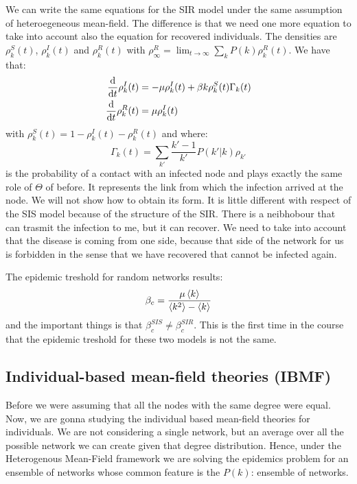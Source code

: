 \documentclass[../main/main.tex]{subfiles}
\begin{document}
We can write the same equations for the SIR model under the same assumption of heteroegeneous mean-field.
The difference is that we need one more equation to take into account also the equation for recovered individuals. The densities are \( \rho _k^S(t) \), \( \rho _k^I (t) \) and \( \rho _k^R (t) \) with \( \rho _ \infty ^R = \lim_{t \rightarrow \infty } \sum_{k}^{} P(k) \rho _k^R (t) \). We have that:
\begin{equation}
\begin{split}
  \dv{}{t} \rho _k^I (t) &= - \mu \rho _k^I (t) + \beta k \rho _k^S (t) \Gamma _k(t)  \\
  \dv{}{t} \rho _k^R (t) &= \mu \rho _k^I (t)
\end{split}
\end{equation}
with \( \rho _k^S (t) = 1 - \rho _k^I (t) - \rho _k^R (t)\) and where:
\begin{equation}
  \Gamma _k (t) = \sum_{k'}^{} \frac{k'-1}{k'} P(k'|k) \rho _{k'}
\end{equation}
is the probability of a contact with an infected node and plays exactly the same role of \( \Theta  \) of before.
It represents the link from which the infection arrived at the node. We will not show how to obtain its form.  It is little different with respect of the SIS model because of the structure of the SIR.
There is a neibhobour that can trasmit the infection to me, but it can recover. We need to take into account that the disease is coming from one side, because that side of the network for us is forbidden in the sense that we have recovered that cannot be infected again.

The epidemic treshold for random networks results:
\begin{equation}
  \beta _c = \frac{\mu \expval{k} }{\expval{k^2} - \expval{k} }
\end{equation}
and the important things is that \( \beta _c^{SIS} \neq \beta _c^{SIR} \). This is the first time in the course that the epidemic treshold for these two models is not the same.

\subsection{Individual-based mean-field theories (IBMF)}

Before we were assuming that all the nodes with the same degree were equal. Now, we are gonna studying the individual based mean-field theories for individuals.
We are not considering a single network, but an average over all the possible network we can create given that degree distribution.
Hence, under the Heterogenous Mean-Field framework we are solving the epidemics problem for an ensemble of networks whose common feature is the \( P(k) \): ensemble of networks.
\end{document}
